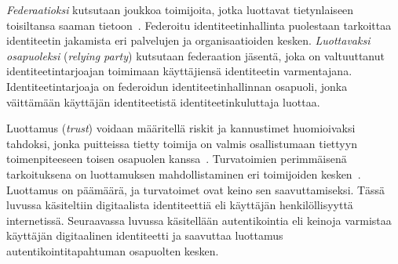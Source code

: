 \documentclass[finnish,gradu]{tktltiki}
\begin{document}
  \emph{Federaatioksi} kutsutaan joukkoa toimijoita, jotka luottavat tietynlaiseen toisiltansa saaman tietoon~\cite{id_in_federation_systems_2005, federated_auth_case_2008}. Federoitu identiteetinhallinta puolestaan tarkoittaa identiteetin jakamista eri palvelujen ja organisaatioiden kesken. \emph{Luottavaksi osapuoleksi} (\emph{relying party}) kutsutaan federaation jäsentä, joka on valtuuttanut identiteetintarjoajan toimimaan käyttäjiensä identiteetin varmentajana. Identiteetintarjoaja on federoidun identiteetinhallinnan osapuoli, jonka väittämään käyttäjän identiteetistä identiteetinkuluttaja luottaa.

    Luottamus (\emph{trust}) voidaan määritellä riskit ja kannustimet huomioivaksi tahdoksi, jonka puitteissa tietty toimija on valmis osallistumaan tiettyyn toimenpiteeseen toisen osapuolen kanssa~\cite{ruohomaa_kutvonen_trust_management_2005}. Turvatoimien perimmäisenä tarkoituksena on luottamuksen mahdollistaminen eri toimijoiden kesken~\cite{schneier_liars_and_outliers_2012}. Luottamus on päämäärä, ja turvatoimet ovat keino sen saavuttamiseksi. Tässä luvussa käsiteltiin digitaalista identiteettiä eli käyttäjän henkilöllisyyttä internetissä. Seuraavassa luvussa käsitellään autentikointia eli keinoja varmistaa käyttäjän digitaalinen identiteetti ja saavuttaa luottamus autentikointitapahtuman osapuolten kesken.


\end{document}
